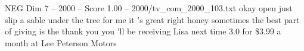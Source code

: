 \begin{textsample}{NEG Dim 7 – 2000 – Score 1.00 – 2000/tv\_com\_2000\_103.txt}  \label{ex:f7_neg_042}
okay open just slip a sable under the tree for me it 's great right honey sometimes the best part of giving is the thank you you 'll be receiving Lisa next time 3.0 for \$3.99 a month at Lee Peterson Motors

\end{textsample}
